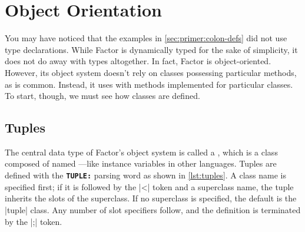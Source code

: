 \section{Object Orientation}\label{sec:primer:oo}

You may have noticed that the examples in \cref{sec:primer:colon-defs} did not
use type declarations.  While Factor is dynamically typed for the sake of
simplicity, it does not do away with types altogether.  In fact, Factor is
object-oriented.  However, its object system doesn't rely on classes possessing
particular methods, as is common.  Instead, it uses  with
methods implemented for particular classes.  To start, though, we must see how
classes are defined.

\subsection{Tuples}

The central data type of Factor's object system is called a , which
is a class composed of named ---like instance variables in other
languages.  Tuples are defined with the \texttt{\textbf{TUPLE:}} parsing word
as shown in \vref{lst:tuples}.  A class name is specified first; if it is
followed by the \factor|<| token and a superclass name, the tuple inherits the
slots of the superclass.  If no superclass is specified, the default is the
\factor|tuple| class.  Any number of slot specifiers follow, and the definition
is terminated by the \factor|;| token.


